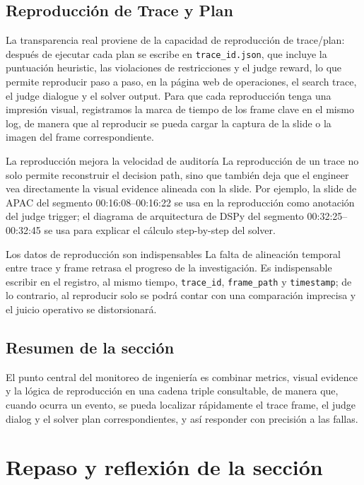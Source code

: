 \documentclass[a4paper]{article}
\begin{document}
\subsection{Reproducción de Trace y Plan}
La transparencia real proviene de la capacidad de reproducción de trace/plan: después de ejecutar cada plan se escribe en \texttt{trace\_id.json}, que incluye la puntuación heuristic, las violaciones de restricciones y el judge reward, lo que permite reproducir paso a paso, en la página web de operaciones, el search trace, el judge dialogue y el solver output. Para que cada reproducción tenga una impresión visual, registramos la marca de tiempo de los frame clave en el mismo log, de manera que al reproducir se pueda cargar la captura de la slide o la imagen del frame correspondiente.
\begin{knowledgebox}{La reproducción mejora la velocidad de auditoría}
La reproducción de un trace no solo permite reconstruir el decision path, sino que también deja que el engineer vea directamente la visual evidence alineada con la slide. Por ejemplo, la slide de APAC del segmento 00:16:08--00:16:22 se usa en la reproducción como anotación del judge trigger; el diagrama de arquitectura de DSPy del segmento 00:32:25--00:32:45 se usa para explicar el cálculo step-by-step del solver.
\end{knowledgebox}
\begin{warningbox}{Los datos de reproducción son indispensables}
La falta de alineación temporal entre trace y frame retrasa el progreso de la investigación. Es indispensable escribir en el registro, al mismo tiempo, \texttt{trace\_id}, \texttt{frame\_path} y \texttt{timestamp}; de lo contrario, al reproducir solo se podrá contar con una comparación imprecisa y el juicio operativo se distorsionará.
\end{warningbox}

\subsection{Resumen de la sección}
El punto central del monitoreo de ingeniería es combinar metrics, visual evidence y la lógica de reproducción en una cadena triple consultable, de manera que, cuando ocurra un evento, se pueda localizar rápidamente el trace frame, el judge dialog y el solver plan correspondientes, y así responder con precisión a las fallas.

\section{Repaso y reflexión de la sección}
\end{document}
